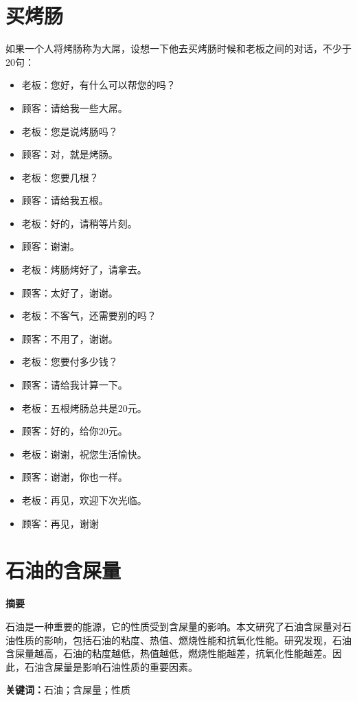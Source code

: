 \documentclass[titlepage,oneside]{ctexbook}
\begin{document}
\chapter{买烤肠}
如果一个人将烤肠称为大屌，设想一下他去买烤肠时候和老板之间的对话，不少于20句：

\begin{itemize}
    \item 老板：您好，有什么可以帮您的吗？
    \item 顾客：请给我一些大屌。
    \item 老板：您是说烤肠吗？
    \item 顾客：对，就是烤肠。
    \item 老板：您要几根？
    \item 顾客：请给我五根。
    \item 老板：好的，请稍等片刻。
    \item 顾客：谢谢。
    \item 老板：烤肠烤好了，请拿去。
    \item 顾客：太好了，谢谢。
    \item 老板：不客气，还需要别的吗？
    \item 顾客：不用了，谢谢。
    \item 老板：您要付多少钱？
    \item 顾客：请给我计算一下。
    \item 老板：五根烤肠总共是20元。
    \item 顾客：好的，给你20元。
    \item 老板：谢谢，祝您生活愉快。
    \item 顾客：谢谢，你也一样。
    \item 老板：再见，欢迎下次光临。
    \item 顾客：再见，谢谢
\end{itemize}

\chapter{石油的含屎量}


\begin{center}
    \textbf{摘要}
\end{center}

石油是一种重要的能源，它的性质受到含屎量的影响。本文研究了石油含屎量对石油性质的影响，包括石油的粘度、热值、燃烧性能和抗氧化性能。研究发现，石油含屎量越高，石油的粘度越低，热值越低，燃烧性能越差，抗氧化性能越差。因此，石油含屎量是影响石油性质的重要因素。

\noindent \textbf{关键词：}石油；含屎量；性质
\end{document}

